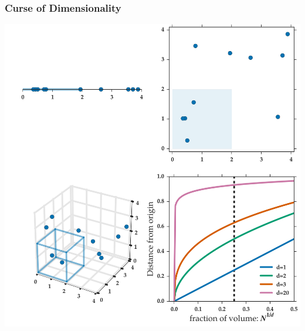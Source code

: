 \documentclass[11pt]{beamer}
\begin{document}
\begin{frame}
  \frametitle{Curse of Dimensionality}
  \begin{center}
    \includegraphics[scale=0.3]{figures/dimensionality.png}
  \end{center}
\end{frame}
\end{document}
